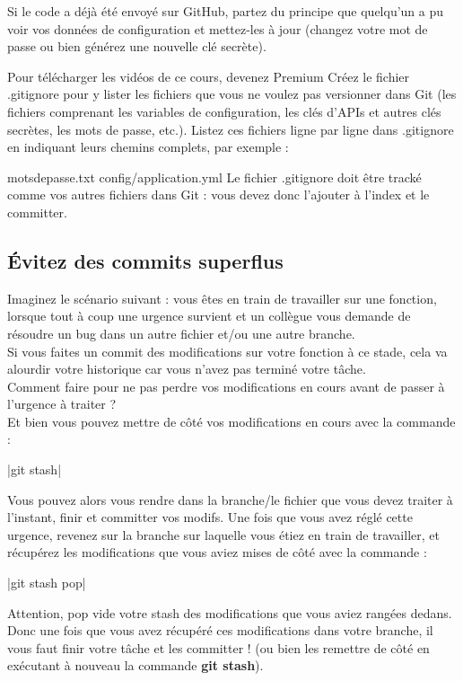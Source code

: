 Si le code a déjà été envoyé sur GitHub, partez du principe que quelqu'un a pu voir vos données de configuration et mettez-les à jour (changez votre mot de passe ou bien générez une nouvelle clé secrète).


 Pour télécharger les vidéos de ce cours, devenez Premium
Créez le fichier .gitignore pour y lister les fichiers que vous ne voulez pas versionner dans Git (les fichiers comprenant les variables de configuration, les clés d'APIs et autres clés secrètes, les mots de passe, etc.). Listez ces fichiers ligne par ligne dans .gitignore en indiquant leurs chemins complets, par exemple : 

motsdepasse.txt
config/application.yml
Le fichier .gitignore doit être tracké comme vos autres fichiers dans Git : vous devez donc l'ajouter à l'index et le committer. 

\subsection{Évitez des commits superflus}
Imaginez le scénario suivant : vous êtes en train de travailler sur une fonction, lorsque tout à coup une urgence survient et un collègue vous demande de résoudre un bug dans un autre fichier et/ou une autre branche. \\

Si vous faites un commit des modifications sur votre fonction à ce stade, cela va alourdir votre historique car vous n'avez pas terminé votre tâche.\\

Comment faire pour ne pas perdre vos modifications en cours avant de passer à l'urgence à traiter ?\\

Et bien vous pouvez mettre de côté vos modifications en cours avec la commande :

|git stash|

Vous pouvez alors vous rendre dans la branche/le fichier que vous devez traiter à l'instant, finir et committer vos modifs. Une fois que vous avez réglé cette urgence, revenez sur la branche sur laquelle vous étiez en train de travailler, et récupérez les modifications que vous aviez mises de côté avec la commande : 

|git stash pop|
 

Attention, pop vide votre stash des modifications que vous aviez rangées dedans. Donc une fois que vous avez récupéré ces modifications dans votre branche, il vous faut finir votre tâche et les committer ! (ou bien les remettre de côté en exécutant à nouveau la commande \textbf{git stash}).\\

